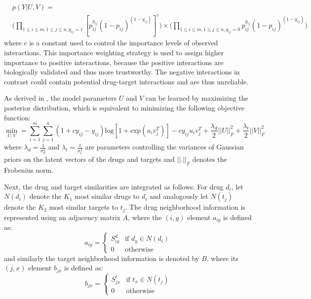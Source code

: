 \begin{equation}
\begin{split}
& p(Y|U,V) = \\
& \big(\prod\limits_{1\leq i \leq m, 1\leq j \leq n, y_{ij}=1} [p_{ij}^{y_{ij}} (1-p_{ij})^{(1-y_{ij})}]^c \big)\times \big(\prod\limits_{1\leq i \leq m, 1\leq j \leq n, y_{ij}=0} p_{ij}^{y_{ij}}(1-p_{ij})^{(1-y_{ij})} \big)
\end{split}
\end{equation}
where $c$ is a constant used to control the importance levels of observed interactions. This importance weighting strategy is used to assign higher importance to positive interactions, because the positive interactions are biologically validated and thus more trustworthy. The negative interactions in contrast could contain potential drug-target interactions and are thus unreliable.

As derived in \cite{liu2016neighborhood}, the model parameters $U$ and $V$ can be learned by maximizing the posterior distribution, which is equivalent to minimizing the following objective function:
\begin{equation}
\label{eq:bla}
\min\limits_{U,V}= \sum\limits_{i=1}^{m} \sum\limits_{j=1}^{n} (1+cy_{ij}-y_{ij})\text{log}[1+\text{exp}(u_iv_j^T)] - cy_{ij}u_iv_j^T + \frac{\lambda_d}{2}||U||^2_F+\frac{\lambda_t}{2}||V||^2_F
\end{equation}
where $\lambda_d=\frac{1}{\sigma^2_d}$ and $\lambda_t=\frac{1}{\sigma^2_t}$ are parameters controlling the variances of Gaussian priors on the latent vectors of the drugs and targets and $||.||_F$ denotes the Frobenius norm.

Next, the drug and target similarities are integrated as follows: For drug $d_i$, let $N(d_i)$ denote the $K_1$ most similar drugs to $d_i$ and analogously let $N(t_j)$ denote the $K_2$ most similar targets to $t_j$. The drug neighborhood information is represented using an adjacency matrix $A$, where the $(i,y)$ element $a_{iy}$ is defined as:
\begin{equation}
a_{iy} = \begin{cases}
S^d_{iy} & \text{if }  d_y \in N(d_i) \\
0 & \text{otherwise} 
\end{cases}
\end{equation}
and similarly the target neighborhood information is denoted by $B$, where its $(j,x)$ element $b_{jx}$ is defined as:
\begin{equation}
b_{jx} = \begin{cases}
S^t_{jx} & \text{if } t_x \in N(t_j) \\
0 & \text{otherwise} 
\end{cases}
\end{equation}

